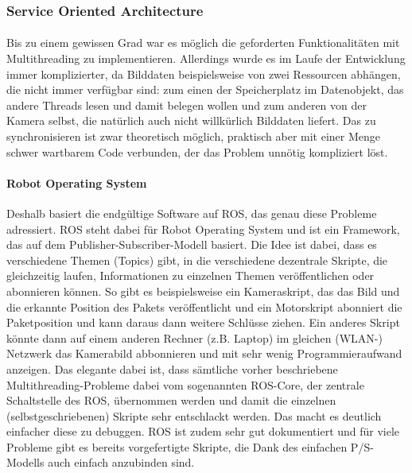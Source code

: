 \subsubsection{Service Oriented Architecture}
\paragraph{}
Bis zu einem gewissen Grad war es möglich die geforderten Funktionalitäten mit Multithreading zu implementieren. Allerdings wurde es im Laufe der Entwicklung immer komplizierter, da Bilddaten beispielsweise von zwei Ressourcen abhängen, die nicht immer verfügbar sind: zum einen der Speicherplatz im Datenobjekt, das andere Threads lesen und damit belegen wollen und zum anderen von der Kamera selbst, die natürlich auch nicht willkürlich Bilddaten liefert. Das zu synchronisieren ist zwar theoretisch möglich, praktisch aber mit einer Menge schwer wartbarem Code verbunden, der das Problem unnötig kompliziert löst.
\paragraph{Robot Operating System}
Deshalb basiert die endgültige Software auf ROS, das genau diese Probleme adressiert. ROS steht dabei für Robot Operating System und ist ein Framework, das auf dem Publisher-Subscriber-Modell basiert. Die Idee ist dabei, dass es verschiedene Themen (Topics) gibt, in die verschiedene dezentrale Skripte, die gleichzeitig laufen, Informationen zu einzelnen Themen veröffentlichen oder abonnieren können. So gibt es beispielsweise ein Kameraskript, das das Bild und die erkannte Position des Pakets veröffentlicht und ein Motorskript abonniert die Paketposition und kann daraus dann weitere Schlüsse ziehen. Ein anderes Skript könnte dann auf einem anderen Rechner (z.B. Laptop) im gleichen (WLAN-) Netzwerk das Kamerabild abbonnieren und mit sehr wenig Programmieraufwand anzeigen. Das elegante dabei ist, dass sämtliche vorher beschriebene Multithreading-Probleme dabei vom sogenannten ROS-Core, der zentrale Schaltstelle des ROS, übernommen werden und damit die einzelnen (selbstgeschriebenen) Skripte sehr entschlackt werden. Das macht es deutlich einfacher diese zu debuggen. ROS ist zudem sehr gut dokumentiert und für viele Probleme gibt es bereits vorgefertigte Skripte, die Dank des einfachen P/S-Modells auch einfach anzubinden sind.

